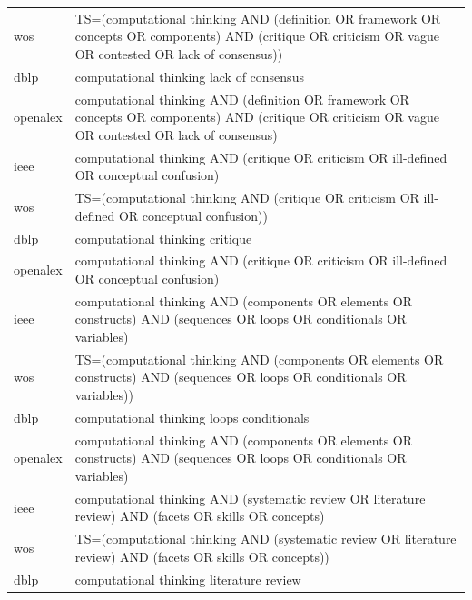 \documentclass{article}
\begin{document}
\begin{longtable}{lp{10cm}}
wos & TS=(\textquotedbl{}computational thinking\textquotedbl{} AND (definition OR framework OR concepts OR components) AND (critique OR criticism OR vague OR contested OR \textquotedbl{}lack of consensus\textquotedbl{})) \\
dblp & computational thinking lack of consensus \\
openalex & \textquotedbl{}computational thinking\textquotedbl{} AND (definition OR framework OR concepts OR components) AND (critique OR criticism OR vague OR contested OR \textquotedbl{}lack of consensus\textquotedbl{}) \\
ieee & \textquotedbl{}computational thinking\textquotedbl{} AND (critique OR criticism OR \textquotedbl{}ill-defined\textquotedbl{} OR \textquotedbl{}conceptual confusion\textquotedbl{}) \\
wos & TS=(\textquotedbl{}computational thinking\textquotedbl{} AND (critique OR criticism OR \textquotedbl{}ill-defined\textquotedbl{} OR \textquotedbl{}conceptual confusion\textquotedbl{})) \\
dblp & computational thinking critique \\
openalex & \textquotedbl{}computational thinking\textquotedbl{} AND (critique OR criticism OR \textquotedbl{}ill-defined\textquotedbl{} OR \textquotedbl{}conceptual confusion\textquotedbl{}) \\
ieee & \textquotedbl{}computational thinking\textquotedbl{} AND (components OR elements OR constructs) AND (sequences OR loops OR conditionals OR variables) \\
wos & TS=(\textquotedbl{}computational thinking\textquotedbl{} AND (components OR elements OR constructs) AND (sequences OR loops OR conditionals OR variables)) \\
dblp & computational thinking loops conditionals \\
openalex & \textquotedbl{}computational thinking\textquotedbl{} AND (components OR elements OR constructs) AND (sequences OR loops OR conditionals OR variables) \\
ieee & \textquotedbl{}computational thinking\textquotedbl{} AND (\textquotedbl{}systematic review\textquotedbl{} OR \textquotedbl{}literature review\textquotedbl{}) AND (facets OR skills OR concepts) \\
wos & TS=(\textquotedbl{}computational thinking\textquotedbl{} AND (\textquotedbl{}systematic review\textquotedbl{} OR \textquotedbl{}literature review\textquotedbl{}) AND (facets OR skills OR concepts)) \\
dblp & computational thinking literature review \\

\end{longtable}
\end{document}
